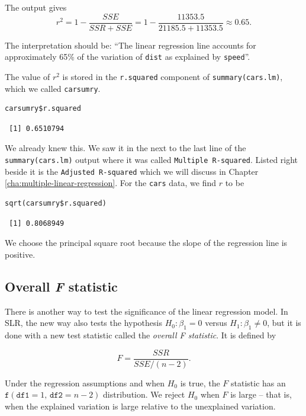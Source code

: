 \documentclass[captions=tableheading]{scrbook}
\begin{document}
The output gives
\[
r^{2}=1-\frac{SSE}{SSR+SSE}=1-\frac{11353.5}{21185.5+11353.5}\approx0.65.
\]

The interpretation should be: ``The linear regression line accounts for approximately 65\% of the variation of \texttt{dist} as explained by \texttt{speed}''.

The value of \(r^{2}\) is stored in the \texttt{r.squared} component of \texttt{summary(cars.lm)}, which we called \texttt{carsumry}.


\begin{verbatim}
carsumry$r.squared
\end{verbatim}

\begin{verbatim}
 [1] 0.6510794
\end{verbatim}

We already knew this. We saw it in the next to the last line of the \texttt{summary(cars.lm)} output where it was called \texttt{Multiple R-squared}. Listed right beside it is the \texttt{Adjusted R-squared} which we will discuss in Chapter \ref{cha:multiple-linear-regression}.  For the \texttt{cars} data, we find \(r\) to be


\begin{verbatim}
sqrt(carsumry$r.squared)
\end{verbatim}

\begin{verbatim}
 [1] 0.8068949
\end{verbatim}

We choose the principal square root because the slope of the regression line is positive.
\subsection{Overall \emph{F} statistic}
\label{sec-1-3-3}

\label{sub:slr-overall-F-statistic}

There is another way to test the significance of the linear regression model. In SLR, the new way also tests the hypothesis \(H_{0}:\beta_{1}=0\) versus \(H_{1}:\beta_{1}\neq0\), but it is done with a new test statistic called the \emph{overall F statistic}. It is defined by

\begin{equation}
F=\frac{SSR}{SSE/(n-2)}.\label{eq:slr-overall-F-statistic}
\end{equation}

Under the regression assumptions and when \(H_{0}\) is true, the \(F\) statistic has an \(\mathtt{f}(\mathtt{df1}=1,\,\mathtt{df2}=n-2)\) distribution. We reject \(H_{0}\) when \(F\) is large -- that is, when the explained variation is large relative to the unexplained variation.
\end{document}
